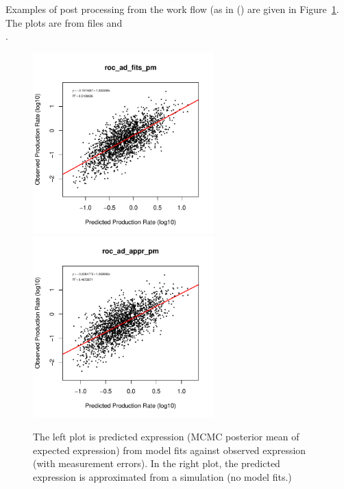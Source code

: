 Examples of post processing from the  work flow (as in 
()
are given in Figure~\ref{fig:prxy}. The plots are from files
 and \\
.
\begin{figure}[ht]
\centering
\includegraphics[width=2.75in]{cubfits-include/figure/prxy_roc_ad_fits_pm_5k-10k}
\includegraphics[width=2.75in]{cubfits-include/figure/prxy_roc_ad_appr_pm_5k-10k}
\caption{The left plot is predicted expression (MCMC posterior mean of expected
expression) from model fits against observed
expression (with measurement errors). In the right plot, the predicted
expression is approximated from a simulation (no model fits.)}
\label{fig:prxy}
\end{figure}

